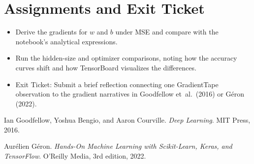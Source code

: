 \documentclass[11pt]{article}
\begin{document}
\section*{Assignments and Exit Ticket}
\begin{itemize}[leftmargin=*]
    \item Derive the gradients for $w$ and $b$ under MSE and compare with the notebook's analytical expressions.
    \item Run the hidden-size and optimizer comparisons, noting how the accuracy curves shift and how TensorBoard visualizes the differences.
    \item Exit Ticket: Submit a brief reflection connecting one GradientTape observation to the gradient narratives in Goodfellow et~al.~(2016) or Géron (2022).
\end{itemize}


\begin{thebibliography}{9}
Ian Goodfellow, Yoshua Bengio, and Aaron Courville.
\newblock \emph{Deep Learning}.
\newblock MIT Press, 2016.

Aur\'elien G\'eron.
\newblock \emph{Hands-On Machine Learning with Scikit-Learn, Keras, and TensorFlow}.
\newblock O'Reilly Media, 3rd edition, 2022.
\end{thebibliography}
\end{document}
